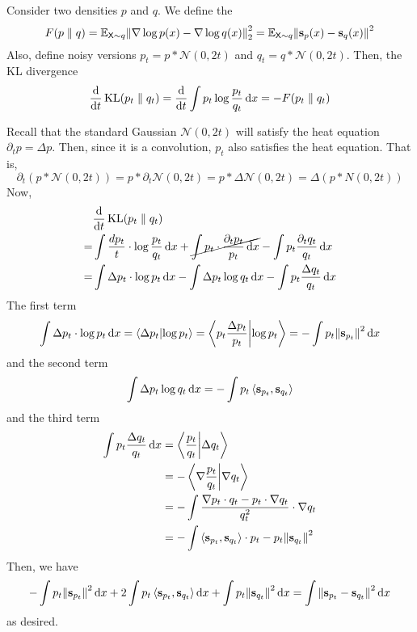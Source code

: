 \documentclass[notes]{agony}
\newcommand{\E}{\mathbb{E}}
\newcommand{\rv}{\mathsf}
\newcommand{\X}{\rv{X}}
\renewcommand{\N}{\mathcal{N}}
\begin{document}
Consider two densities $p$ and $q$.
We define the 
\[
	F(p \parallel q)
	= \E_{\X \sim q}\norm{\nabla \log p(x) - \nabla \log q(x)}_2^2
	= \E_{\X \sim q} \norm{\vb s_p(x) - \vb s_q(x)}^2
\]
Also, define noisy versions $p_t = p \ast \N(0,2t)$ and $q_t = q \ast \N(0,2t)$.
Then, the KL divergence
\begin{align*}
	\dv{t} \operatorname{KL}(p_t \parallel q_t)
	= \dv{t} \int p_t \log\frac{p_t}{q_t} \dd{x}
	= -F(p_t \parallel q_t)
\end{align*}
\begin{prf}
	Recall that the standard Gaussian $\N(0,2t)$ will satisfy the heat equation
	$\partial_t p = \Delta p$.
	Then, since it is a convolution, $p_t$ also satisfies the heat equation.
	That is,
	\[
		\partial_t(p \ast \N(0,2t))
		= p \ast \partial_t \N(0,2t)
		= p \ast \Delta \N(0,2t)
		= \Delta (p \ast N(0,2t))
	\]
	Now,
	\begin{align*}
		&\dv{t} \operatorname{KL}(p_t \parallel q_t) \\
		  =& \int \frac{dp_t}{t} \cdot \log\frac{p_t}{q_t} \dd{x}
		+ \cancel{\int p_t \cdot \frac{\partial_t p_t}{p_t} \dd{x}}
		- \int p_t\frac{\partial_t q_t}{q_t}\dd{x}               \\
		= & \int \Delta p_t \cdot \log p_t \dd{x}
		- \int \Delta p_t \log q_t \dd{x} 
		- \int p_t \frac{\Delta q_t}{q_t} \dd{x}
	\end{align*}
	The first term 
	\[
		\int \Delta p_t \cdot \log p_t \dd{x}
		= \ip{\Delta p_t}{\log p_t} = \ip{p_t\frac{\Delta p_t}{p_t}}{\log p_t} = -\int p_t\norm{\vb s_{p_t}}^2 \dd{x}
	\]
	and the second term
	\[
		\int \Delta p_t \log q_t \dd{x} = -\int p_t\ev{\vb s_{p_t}, \vb s_{q_t}}
	\]
	and the third term
	\begin{align*}
		\int p_t \frac{\Delta q_t}{q_t} \dd{x} 
		& = \ip{\frac{p_t}{q_t}}{\Delta q_t} \\
		& = -\ip{\nabla\frac{p_t}{q_t}}{\nabla q_t} \\
		& = -\int \frac{\nabla p_t \cdot q_t - p_t \cdot \nabla q_t}{q_t^2} \cdot \nabla q_t \\
		& = -\int \ev{\vb s_{p_t}, \vb s_{q_t}} \cdot p_t - p_t \norm{\vb s_{q_t}}^2
	\end{align*}
	Then, we have
	\begin{align*}
		-\int p_t\norm{\vb s_{p_t}}^2 \dd{x}
		+ 2\int p_t\ev{\vb s_{p_t}, \vb s_{q_t}} \dd{x}
		+ \int p_t \norm{\vb s_{q_t}}^2 \dd{x}
		= \int \norm{\vb s_{p_t} - \vb s_{q_t}}^2 \dd{x}
	\end{align*}
	as desired.
\end{prf}
\end{document}
